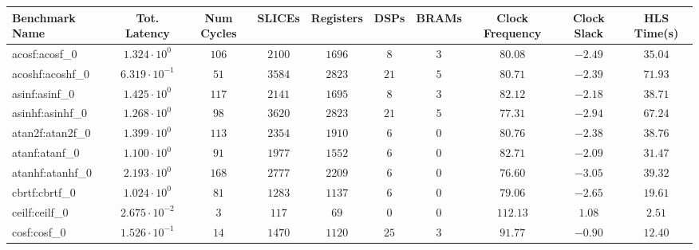 \begin{tabular}{|l|c|c|c|c|c|c|c|c|c|}
\hline
Benchmark Name               & Tot. Latency            & Num Cycles & SLICEs    & Registers & DSPs    & BRAMs  & Clock Frequency & Clock Slack & HLS Time(s) \\
\hline
acosf:acosf\_0               & $ 1.324 \cdot 10^{0}  $ & $ 106    $ & $ 2100  $ & $ 1696  $ & $ 8   $ & $ 3  $ & $ 80.08       $ & $ -2.49   $ & $ 35.04   $ \\
acoshf:acoshf\_0             & $ 6.319 \cdot 10^{-1} $ & $ 51     $ & $ 3584  $ & $ 2823  $ & $ 21  $ & $ 5  $ & $ 80.71       $ & $ -2.39   $ & $ 71.93   $ \\
asinf:asinf\_0               & $ 1.425 \cdot 10^{0}  $ & $ 117    $ & $ 2141  $ & $ 1695  $ & $ 8   $ & $ 3  $ & $ 82.12       $ & $ -2.18   $ & $ 38.71   $ \\
asinhf:asinhf\_0             & $ 1.268 \cdot 10^{0}  $ & $ 98     $ & $ 3620  $ & $ 2823  $ & $ 21  $ & $ 5  $ & $ 77.31       $ & $ -2.94   $ & $ 67.24   $ \\
atan2f:atan2f\_0             & $ 1.399 \cdot 10^{0}  $ & $ 113    $ & $ 2354  $ & $ 1910  $ & $ 6   $ & $ 0  $ & $ 80.76       $ & $ -2.38   $ & $ 38.76   $ \\
atanf:atanf\_0               & $ 1.100 \cdot 10^{0}  $ & $ 91     $ & $ 1977  $ & $ 1552  $ & $ 6   $ & $ 0  $ & $ 82.71       $ & $ -2.09   $ & $ 31.47   $ \\
atanhf:atanhf\_0             & $ 2.193 \cdot 10^{0}  $ & $ 168    $ & $ 2777  $ & $ 2209  $ & $ 6   $ & $ 0  $ & $ 76.60       $ & $ -3.05   $ & $ 39.32   $ \\
cbrtf:cbrtf\_0               & $ 1.024 \cdot 10^{0}  $ & $ 81     $ & $ 1283  $ & $ 1137  $ & $ 6   $ & $ 0  $ & $ 79.06       $ & $ -2.65   $ & $ 19.61   $ \\
ceilf:ceilf\_0               & $ 2.675 \cdot 10^{-2} $ & $ 3      $ & $ 117   $ & $ 69    $ & $ 0   $ & $ 0  $ & $ 112.13      $ & $ 1.08    $ & $ 2.51    $ \\
cosf:cosf\_0                 & $ 1.526 \cdot 10^{-1} $ & $ 14     $ & $ 1470  $ & $ 1120  $ & $ 25  $ & $ 3  $ & $ 91.77       $ & $ -0.90   $ & $ 12.40   $ \\

\end{tabular}
